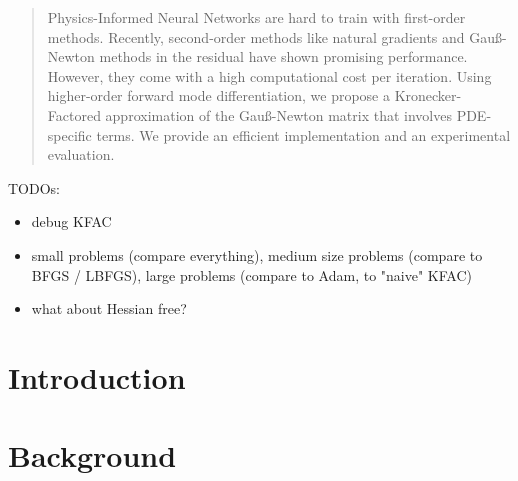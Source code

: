 \documentclass{article}
\begin{document}
\maketitle

\begin{abstract}
  Physics-Informed Neural Networks are hard to train with first-order methods. Recently, second-order methods like natural gradients and Gauß-Newton methods in the residual have shown promising performance. However, they come with a high computational cost per iteration. Using higher-order forward mode differentiation, we propose a Kronecker-Factored approximation of the Gauß-Newton matrix that involves PDE-specific terms. We provide an efficient implementation and an experimental evaluation. 
\end{abstract}

TODOs: 
\begin{itemize}
    \item debug KFAC 
    \item small problems (compare everything), medium size problems (compare to BFGS / LBFGS), large problems (compare to Adam, to "naive" KFAC) 
    \item what about Hessian free?
\end{itemize}

\section{Introduction}


\section{Background}



\end{document}
